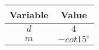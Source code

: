 \begin{tabular}{|c|c|}
\hline
\textbf{Variable} & \textbf{Value} \\
\hline
$d$ & $4$ \\
\hline
$m$ & $-cot 15^\circ$ \\
\hline
\end{tabular}